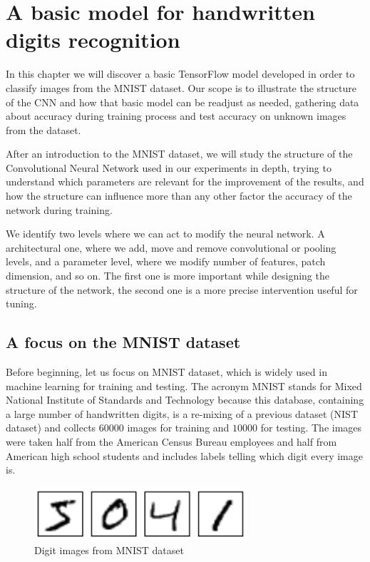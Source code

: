 \chapter{A basic model for handwritten digits recognition}\label{ch:basic_tf_model}

In this chapter we will discover a basic TensorFlow model developed in order to classify images from the MNIST dataset. Our scope is to illustrate the structure of the \acs{CNN} and how that basic model can be readjust as needed, gathering data about accuracy during training process and test accuracy on unknown images from the dataset.

After an introduction to the MNIST dataset, we will study the structure of the Convolutional Neural Network used in our experiments in depth, trying to understand which parameters are relevant for the improvement of the results, and how the structure can influence more than any other factor the accuracy of the network during training.

We identify two levels where we can act to modify the neural network. A architectural one, where we add, move and remove convolutional or pooling levels, and a parameter level, where we modify number of features, patch dimension, and so on. The first one is more important while designing the structure of the network, the second one is a more precise intervention useful for tuning.

\section{A focus on the MNIST dataset}

Before beginning, let us focus on MNIST dataset, which is widely used in machine learning for training and testing. The acronym MNIST stands for Mixed National Institute of Standards and Technology because this database, containing a large number of handwritten digits, is a re-mixing of a previous dataset (NIST dataset) and collects $60000$ images for training and $10000$ for testing. The images were taken half from the American Census Bureau employees and half from American high school students and includes labels telling which digit every image is.

\begin{figure}
	\centering
	\includegraphics[width=0.7\textwidth]{Images/MNIST_images}
	\caption{Digit images from MNIST dataset}
	\label{fig:MNIST_images}
\end{figure}

